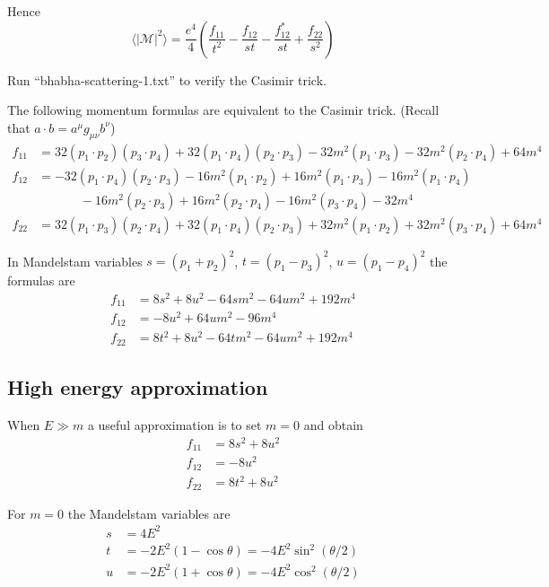 \documentclass[12pt]{article}
\begin{document}
\noindent
Hence
\begin{equation*}
\langle|\mathcal{M}|^2\rangle
=\frac{e^4}{4}
\left(
\frac{f_{11}}{t^2} - \frac{f_{12}}{st} -
\frac{f_{12}^*}{st} + \frac{f_{22}}{s^2}
\right)
\end{equation*}

\noindent
Run ``bhabha-scattering-1.txt'' to verify the Casimir trick.

\bigskip
\noindent
The following momentum formulas are equivalent to the Casimir trick.
(Recall that $a\cdot b=a^\mu g_{\mu\nu}b^\nu$)
\begin{align*}
f_{11}&=
32(p_1\cdot p_2)(p_3\cdot p_4)+32(p_1\cdot p_4)(p_2\cdot p_3)
-32 m^2(p_1\cdot p_3)-32 m^2(p_2\cdot p_4)+64 m^4
\\
f_{12}&=
-32 (p_1\cdot p_4) (p_2\cdot p_3)
-16 m^2 (p_1\cdot p_2) + 16 m^2 (p_1\cdot p_3) - 16 m^2 (p_1\cdot p_4)\\
&\phantom{=}\qquad
{}- 16 m^2 (p_2\cdot p_3) + 16 m^2 (p_2\cdot p_4) - 16 m^2 (p_3\cdot p_4) - 32 m^4
\\
f_{22}&=
32(p_1\cdot p_3)(p_2\cdot p_4)+32(p_1\cdot p_4)(p_2\cdot p_3)
+32 m^2(p_1\cdot p_2)+32 m^2(p_3\cdot p_4)+64 m^4
\end{align*}

\noindent
In Mandelstam variables $s=(p_1+p_2)^2$, $t=(p_1-p_3)^2$, $u=(p_1-p_4)^2$ the formulas are
\begin{align*}
f_{11} &= 8 s^2 + 8 u^2 - 64 s m^2 - 64 u m^2 + 192 m^4
\\
f_{12} &= -8 u^2 + 64 u m^2 - 96 m^4
\\
f_{22} &= 8 t^2 + 8 u^2 - 64 t m^2 - 64 u m^2 + 192 m^4
\end{align*}

\subsection*{High energy approximation}
When $E\gg m$ a useful approximation is to set $m=0$ and obtain
\begin{align*}
f_{11}&= 8 s^2 + 8 u^2\\
f_{12}&= -8 u^2\\
f_{22}&= 8 t^2 + 8 u^2
\end{align*}

\noindent
For $m=0$ the Mandelstam variables are
\begin{align*}
s&=4E^2
\\
t&=-2E^2(1-\cos\theta)=-4E^2\sin^2(\theta/2)
\\
u&=-2E^2(1+\cos\theta)=-4E^2\cos^2(\theta/2)
\end{align*}
\end{document}
